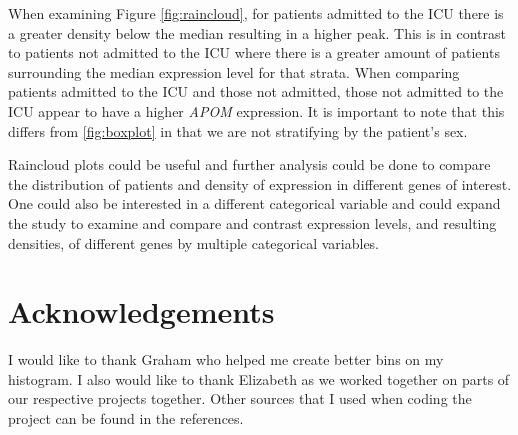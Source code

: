 \documentclass{article}
\begin{document}
When examining Figure \ref{fig:raincloud}, for patients admitted to the ICU there is a greater density below the median resulting in a higher peak. This is in contrast to patients not admitted to the ICU where there is a greater amount of patients surrounding the median expression level for that strata. When comparing patients admitted to the ICU and those not admitted, those not admitted to the ICU appear to have a higher \emph{APOM} expression. It is important to note that this differs from \ref{fig:boxplot} in that we are not stratifying by the patient's sex.

Raincloud plots could be useful and further analysis could be done to compare the distribution of patients and density of expression in different genes of interest. One could also be interested in a different categorical variable and could expand the study to examine and compare and contrast expression levels, and resulting densities, of different genes by multiple categorical variables.

\section{Acknowledgements}
I would like to thank Graham who helped me create better bins on my histogram. I also would like to thank Elizabeth as we worked together on parts of our respective projects together. Other sources that I used when coding the project can be found in the references.\cite{baptiste_answer_2015}\cite{mcjudd_using_2015}\cite{noauthor_add_nodate}\cite{noauthor_graphics_nodate}\cite{noauthor_how_nodate}\cite{noauthor_solved-combining_nodate}



\end{document}
